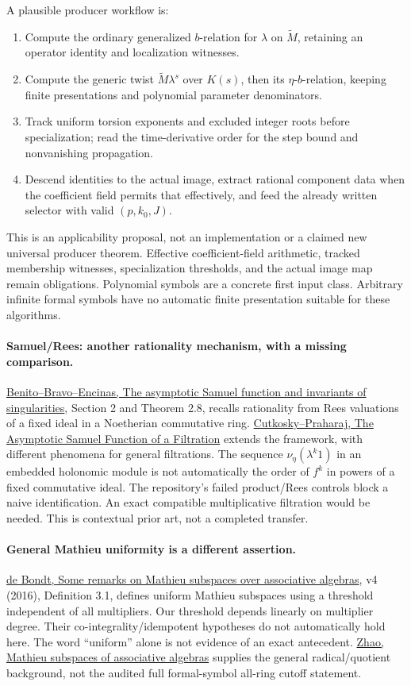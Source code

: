 \documentclass[11pt]{article}
\begin{document}
A plausible producer workflow is:
\begin{enumerate}
\item Compute the ordinary generalized $b$-relation for $\lambda$ on $\widetilde M$, retaining an operator identity and localization witnesses.
\item Compute the generic twist $\widetilde M\lambda^s$ over $K(s)$, then its $\eta$-$b$-relation, keeping finite presentations and polynomial parameter denominators.
\item Track uniform torsion exponents and excluded integer roots before specialization; read the time-derivative order for the step bound and nonvanishing propagation.
\item Descend identities to the actual image, extract rational component data when the coefficient field permits that effectively, and feed the already written selector with valid $(p,k_0,J)$.
\end{enumerate}
This is an applicability proposal, not an implementation or a claimed new universal producer theorem. Effective coefficient-field arithmetic, tracked membership witnesses, specialization thresholds, and the actual image map remain obligations. Polynomial symbols are a concrete first input class. Arbitrary infinite formal symbols have no automatic finite presentation suitable for these algorithms.

\paragraph{Samuel/Rees: another rationality mechanism, with a missing comparison.}
\href{https://link.springer.com/article/10.1007/s13163-023-00457-2}{Benito--Bravo--Encinas, The asymptotic Samuel function and invariants of singularities}, Section 2 and Theorem 2.8, recalls rationality from Rees valuations of a fixed ideal in a Noetherian commutative ring. \href{https://arxiv.org/abs/2211.13205}{Cutkosky--Praharaj, The Asymptotic Samuel Function of a Filtration} extends the framework, with different phenomena for general filtrations. The sequence $\nu_\eta(\lambda^k1)$ in an embedded holonomic module is not automatically the order of $f^k$ in powers of a fixed commutative ideal. The repository's failed product/Rees controls block a naive identification. An exact compatible multiplicative filtration would be needed. This is contextual prior art, not a completed transfer.

\paragraph{General Mathieu uniformity is a different assertion.}
\href{https://arxiv.org/abs/1101.1112}{de Bondt, Some remarks on Mathieu subspaces over associative algebras}, v4 (2016), Definition 3.1, defines uniform Mathieu subspaces using a threshold independent of all multipliers. Our threshold depends linearly on multiplier degree. Their co-integrality/idempotent hypotheses do not automatically hold here. The word ``uniform'' alone is not evidence of an exact antecedent. \href{https://arxiv.org/abs/1005.4260}{Zhao, Mathieu subspaces of associative algebras} supplies the general radical/quotient background, not the audited full formal-symbol all-ring cutoff statement.
\end{document}
